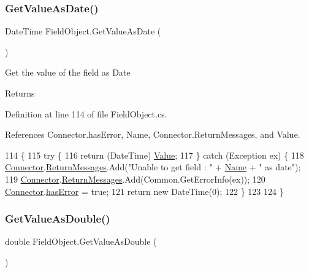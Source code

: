 \subsubsection{\texorpdfstring{Get\+Value\+As\+Date()}{GetValueAsDate()}}
{\footnotesize\ttfamily Date\+Time Field\+Object.\+Get\+Value\+As\+Date (\begin{DoxyParamCaption}{ }\end{DoxyParamCaption})}



Get the value of the field as Date 

\begin{DoxyReturn}{Returns}

\end{DoxyReturn}


Definition at line 114 of file Field\+Object.\+cs.



References Connector.\+has\+Error, Name, Connector.\+Return\+Messages, and Value.


\begin{DoxyCode}
114                                      \{
115         \textcolor{keywordflow}{try} \{
116             \textcolor{keywordflow}{return} (DateTime) \mbox{\hyperlink{class_field_object_a9764fb1824cec95b82cd6ac0b4cd8919}{Value}};
117         \} \textcolor{keywordflow}{catch} (Exception ex) \{
118             \mbox{\hyperlink{class_connector}{Connector}}.\mbox{\hyperlink{class_connector_a1ed422674b344524fd77998dcf6a9ba6}{ReturnMessages}}.Add(\textcolor{stringliteral}{"Unable to get field : "} + 
      \mbox{\hyperlink{class_field_object_ae5d972e96a3eca93407da8e8a89abfd1}{Name}} + \textcolor{stringliteral}{" as date"});
119             \mbox{\hyperlink{class_connector}{Connector}}.\mbox{\hyperlink{class_connector_a1ed422674b344524fd77998dcf6a9ba6}{ReturnMessages}}.Add(Common.GetErrorInfo(ex));
120             \mbox{\hyperlink{class_connector}{Connector}}.\mbox{\hyperlink{class_connector_a079bae21a5417efa53bfe8954c0f533f}{hasError}} = \textcolor{keyword}{true};
121             \textcolor{keywordflow}{return} \textcolor{keyword}{new} DateTime(0);
122         \}
123        
124     \}
\end{DoxyCode}
\mbox{\label{class_field_object_aafe2b7d3e7d414345d85e19dddce3c47}} 
\subsubsection{\texorpdfstring{Get\+Value\+As\+Double()}{GetValueAsDouble()}}
{\footnotesize\ttfamily double Field\+Object.\+Get\+Value\+As\+Double (\begin{DoxyParamCaption}{ }\end{DoxyParamCaption})}



